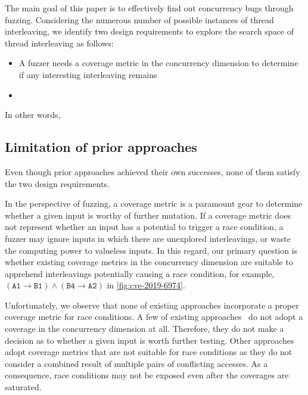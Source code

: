 %
The main goal of this paper is to effectively find out concurrency
bugs through fuzzing.
%
Considering the numerous number of possible instances of thread
interleaving, we identify two design requirements to explore the
search space of thread interleaving as follows:

\begin{itemize}
\item A fuzzer needs a coverage metric in the concurrency dimension to
  determine if any interesting interleaving remains
\item 
\end{itemize}


In other words,


\subsection{Limitation of prior approaches}
\label{ss:existingapproaches}

Even though prior approaches achieved their own successes, none of
them satisfy the two design requirements.

\PP{}


\PP{}


In the perspective of fuzzing, a coverage metric is a paramount gear
to determine whether a given input is worthy of further mutation.
%
If a coverage metric does not represent whether an input has a
potential to trigger a race condition, a fuzzer may ignore inputs in
which there are unexplored interleavings, or waste the computing power
to valueless inputs.
%
In this regard, our primary question is whether existing coverage
metrics in the concurrency dimension are suitable to apprehend
interleavings potentially causing a race condition, for example,
$(\texttt{A1} \rightarrow \texttt{B1}) \wedge (\texttt{B4} \rightarrow
\texttt{A2})$ in \autoref{fig:cve-2019-6974}.



Unfortunately, we observe that none of existing approaches incorporate
a proper coverage metric for race conditions.
%
A few of existing approaches~\cite{snowboard, razzer} do not adopt a
coverage in the concurrency dimension at all. Therefore, they do not
make a decision as to whether a given input is worth further testing.
%
Other approaches~\cite{krace, muzz} adopt coverage metrics that are
not suitable for race conditions as they do not consider a combined
result of multiple pairs of conflicting accesses. As a consequence,
race conditions may not be exposed even after the coverages are
saturated.
%


